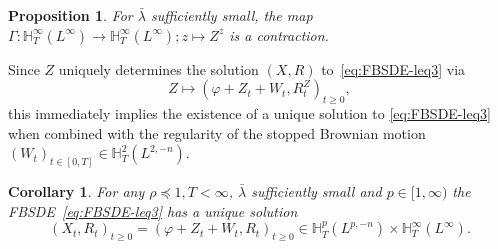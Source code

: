 \documentclass[11pt, a4paper]{scrartcl}
\numberwithin{equation}{section}
\theoremstyle{plain}
\newtheorem{corollary}[foo]{Corollary}
\newtheorem{proposition}[foo]{Proposition}
\theoremstyle{remark}
\begin{document}
\begin{proposition}
	\label{prop:contraction}For $\bar{\lambda}$ sufficiently small, the map $\Gamma :
		\mathbb{H}^{\infty}_T (L^{\infty}) \rightarrow \mathbb{H}^{\infty}_T
		(L^{\infty}) ; z \mapsto Z^z$ is a contraction.
\end{proposition}

Since $Z$ uniquely determines the solution $(X, R)$ to~\eqref{eq:FBSDE-leq3}
via
\[ Z \mapsto (\varphi + Z_t + W_t, R^Z_t)_{t \geqslant 0}, \]
this immediately implies the existence of a unique solution to
\eqref{eq:FBSDE-leq3} when combined with the regularity of the stopped
Brownian motion $(W_t)_{t \in [0, T]} \in \mathbb{H}^2_T (L^{2, - n})$.

\begin{corollary}
	\label{cor:well-posedness}For any $\rho \preceq  1, T < \infty$, $\bar{\lambda}$ sufficiently small and $p \in
		[1, \infty)$ the FBSDE~\eqref{eq:FBSDE-leq3} has a unique solution
	\[ (X_t, R_t)_{t \geqslant 0} = (\varphi + Z_t + W_t, R_t)_{t \geqslant 0}
		\in \mathbb{H}^p_T (L^{p, - n}) \times \mathbb{H}^{\infty}_T (L^{\infty})
		. \]
\end{corollary}
\end{document}
